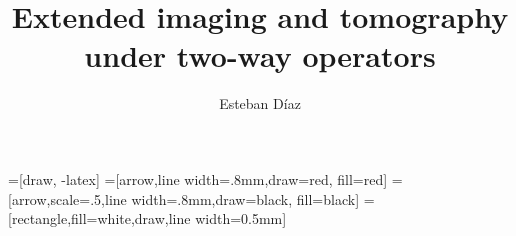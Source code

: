 

\def\xs{{\xx_s}}


\title[]{Extended imaging and tomography under two-way operators}
\subtitle{}
\author[]{Esteban D\'{i}az}
\date{}
\logo{}



\huge

\def\big#1{\begin{center} \LARGE \textbf{#1} \end{center}}
\def\cen#1{\begin{center}        \textbf{#1} \end{center}}


=[draw, -latex] 
=[arrow,line width=.8mm,draw=red, fill=red]
=[arrow,scale=.5,line width=.8mm,draw=black, fill=black]
=[rectangle,fill=white,draw,line width=0.5mm]


 { \cwpcover }






\begin{frame}
\vspace{-2cm}
\end{frame}
\begin{frame}
\vspace{-2cm}
\end{frame}


\begin{frame}
\vspace{-2cm}
\end{frame}



\begin{frame}
\vspace{-2cm}
\end{frame}

\begin{frame}
\vspace{-2cm}
\end{frame}


\begin{frame}
\vspace{-2cm}
\end{frame}




